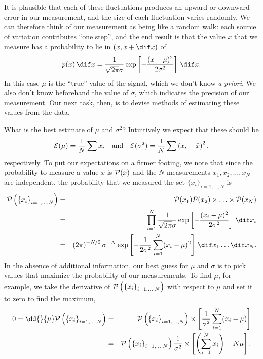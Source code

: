 It is plausible that each of these fluctuations produces an upward or downward error in our measurement, and the size of each fluctuation varies randomly.  We can therefore think of our measurement as being like a random walk: each source of variation contributes ``one step'', and the end result is that the value $x$ that we measure has a probability to lie in $(x,x+\dif x)$ of
\[ p(x)\,\dif x = \frac{1}{\sqrt{2\pi}\sigma}\exp\left[-\frac{(x-\mu)^{2}}{2\sigma^{2}}\right]\,\dif x. \]
In this case $\mu$ is the ``true'' value of the signal, which we don't know \emph{a priori}.  We also don't know beforehand the value of $\sigma$, which indicates the precision of our measurement. Our next task, then, is to devise methods of estimating these values from the data.

  What is the best estimate of $\mu$ and $\sigma^{2}$?  Intuitively we expect that these should be
\[
	\mathcal{E}(\mu) = \frac{1}{N}\sum x_{i}\quad\textrm{and}\quad\mathcal{E}(\sigma^{2}) = \frac{1}{N}\sum\left(x_{i}-\bar{x}\right)^{2},
\]
respectively. To put our expectations on a firmer footing, we note that since the probability to measure a value $x$ is $\mathcal{P}(x)$ and the $N$ measurements $x_{1}, x_{2}, \ldots, x_{N}$ are independent, the  probability that we measured the set $\{x_{i}\}_{i=1,\ldots,N}$ is
\begin{eqnarray*}
	\prob\left(\left\{x_{i}\right\}_{i=1,\ldots,N}\right) &=& \prob(x_{1})\prob(x_{2})\times\ldots\times\prob(x_{N})\\	
	&=& \prod_{i=1}^{N}\frac{1}{\sqrt{2\pi}\sigma}\exp\left[-\frac{(x_{i}-\mu)^{2}}{2\sigma^{2}}\right]\,\dif x_{i}\\
	&=& \left(2\pi\right)^{-N/2}\sigma^{-N}\exp\left[-\frac{1}{2\sigma^{2}}\sum_{i=1}^{N}(x_{i}-\mu)^{2}\right]\,\dif x_{1}\ldots\dif x_{N}.
\end{eqnarray*}
In the absence of additional information, our best guess for $\mu$ and $\sigma$ is to pick values that maximize the probability of our measurements.  To find $\mu$, for example, we take the derivative of $\mathcal{P}\left(\left\{x_{i}\right\}_{i=1,\ldots,N}\right)$ with respect to $\mu$ and set it to zero to find the maximum,
\begin{eqnarray*}
	0 = \dd{}{\mu}\prob\left(\left\{x_{i}\right\}_{i=1,\ldots,N}\right) &=& \prob\left(\left\{x_{i}\right\}_{i=1,\ldots,N}\right)\times\left[\frac{1}{\sigma^{2}}\sum_{i=1}^{N}(x_{i}-\mu)\right]\\
	&=& \prob\left(\left\{x_{i}\right\}_{i=1,\ldots,N}\right)\frac{1}{\sigma^{2}}\times
		\left[\left(\sum_{i=1}^{N}x_{i}\right) - N\mu\right].
\end{eqnarray*}
